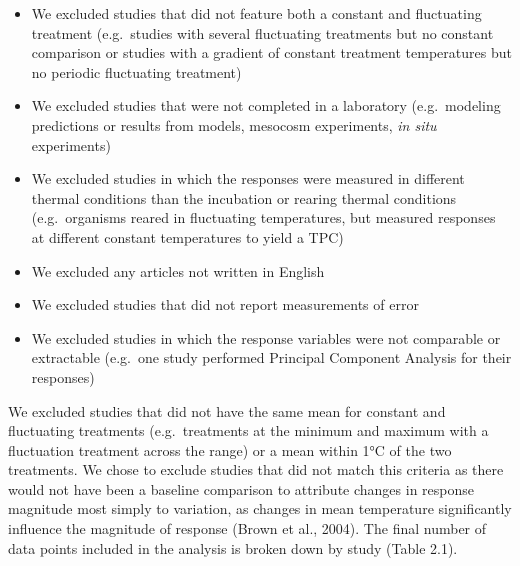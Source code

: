 \documentclass[12pt,twoside]{reedthesis}
\providecommand{\tightlist}{%
  \setlength{\itemsep}{0pt}\setlength{\parskip}{0pt}}
\begin{document}
\begin{itemize}
\tightlist
\item
  We excluded studies that did not feature both a constant and fluctuating treatment (e.g.~studies with several fluctuating treatments but no constant comparison or studies with a gradient of constant treatment temperatures but no periodic fluctuating treatment)
\item
  We excluded studies that were not completed in a laboratory (e.g.~modeling predictions or results from models, mesocosm experiments, \emph{in situ} experiments)
\item
  We excluded studies in which the responses were measured in different thermal conditions than the incubation or rearing thermal conditions (e.g.~organisms reared in fluctuating temperatures, but measured responses at different constant temperatures to yield a TPC)
\item
  We excluded any articles not written in English
\item
  We excluded studies that did not report measurements of error
\item
  We excluded studies in which the response variables were not comparable or extractable (e.g.~one study performed Principal Component Analysis for their responses)
\end{itemize}
We excluded studies that did not have the same mean for constant and fluctuating treatments (e.g.~treatments at the minimum and maximum with a fluctuation treatment across the range) or a mean within 1°C of the two treatments. We chose to exclude studies that did not match this criteria as there would not have been a baseline comparison to attribute changes in response magnitude most simply to variation, as changes in mean temperature significantly influence the magnitude of response (Brown et al., 2004). The final number of data points included in the analysis is broken down by study (Table 2.1).
\end{document}
